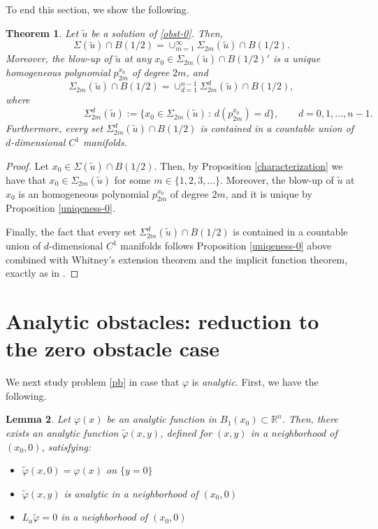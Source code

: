 \documentclass[11pt]{amsart}
\theoremstyle{plain}
\newtheorem{thrm}{Theorem}[section]
\newtheorem{lemma}[thrm]{Lemma}
\numberwithin{equation}{section}
\begin{document}
To end this section, we show the following.

\begin{thrm}\label{structure-0}
Let $\tilde u$ be a solution of \eqref{obst-0}.
Then,
\[\Sigma(\tilde u)\cap B(1/2)=\cup_{m=1}^\infty \Sigma_{2m}(\tilde u)\cap B(1/2).\]
Moreover, the blow-up of $\tilde u$ at any $x_0\in \Sigma_{2m}(\tilde u)\cap B(1/2)'$ is a {unique} homogeneous polynomial $p_{2m}^{x_0}$ of degree $2m$, and
\[\Sigma_{2m}(\tilde u)\cap B(1/2)=\cup_{d=1}^{n-1}\Sigma_{2m}^d(\tilde u)\cap B(1/2),\]
where
\begin{equation}\label{Sigma-2m-d-0}
\qquad\qquad\qquad\qquad\Sigma_{2m}^d(\tilde u):=\bigl\{x_0\in \Sigma_{2m}(\tilde u)\,:\, d(p_{2m}^{x_0})=d\bigr\},\qquad d=0,1,...,n-1.
\end{equation}
Furthermore, every set $\Sigma_{2m}^d(\tilde u)\cap B(1/2)$ is contained in a countable union of $d$-dimensional $C^1$ manifolds.
\end{thrm}

\begin{proof}
Let $x_0\in \Sigma(\tilde u)\cap B(1/2)$.
Then, by Proposition \ref{characterization} we have that $x_0\in \Sigma_{2m}(\tilde u)$ for some $m\in\{1,2,3,...\}$.
Moreover, the blow-up of $\tilde u$ at $x_0$ is an homogeneous polynomial $p_{2m}^{x_0}$ of degree $2m$, and it is unique by Proposition \ref{uniqeness-0}.

Finally, the fact that every set $\Sigma_{2m}^d(\tilde u)\cap B(1/2)$ is contained in a countable union of $d$-dimensional $C^1$ manifolds follows Proposition \ref{uniqeness-0} above combined with Whitney's extension theorem and the implicit function theorem, exactly as in \cite[Theorem 1.3.8]{GP}.

\end{proof}

\section{Analytic obstacles: reduction to the zero obstacle case}
\label{sec5}

We next study problem \eqref{pb} in case that $\varphi$ is \emph{analytic}.
First, we have the following.

\begin{lemma}\label{analytic}
Let $\varphi(x)$ be an analytic function in $B_1(x_0)\subset {\mathbb R}^n$.
Then, there exists an analytic function $\tilde \varphi(x,y)$, defined for $(x,y)$ in a neighborhood of $(x_0,0)$, satisfying:
\begin{itemize}
\item $\tilde \varphi(x,0)=\varphi(x)$ on $\{y=0\}$
\item $\tilde\varphi(x,y)$ is analytic in a neighborhood of $(x_0,0)$
\item $L_a\tilde\varphi=0$ in a neighborhood of $(x_0,0)$
\end{itemize}
\end{lemma}
\end{document}

